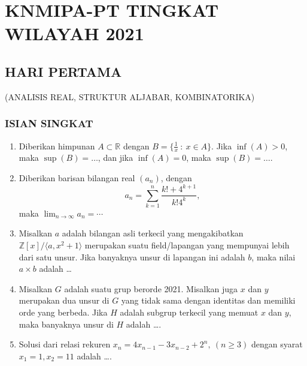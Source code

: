 \documentclass[12pt,twoside]{article}
\begin{document}
\section{KNMIPA-PT TINGKAT WILAYAH 2021}
\subsection{HARI PERTAMA}
\begin{center}
	(ANALISIS REAL, STRUKTUR ALJABAR, KOMBINATORIKA)
\end{center}
\subsubsection*{ISIAN SINGKAT}
\begin{enumerate}
	\item Diberikan himpunan $A\subset \mathbb{R}$ dengan $B=\{\frac{1}{x}~:~x\in A\}$. Jika $\inf(A)>0$, maka $\sup(B)=\dots$, dan jika $\inf(A)=0$, maka $\sup(B)=\dots$.
	\item Diberikan barisan bilangan real $(a_n)$, dengan
	      \[a_n =\sum_{k=1}^n \frac{k!+4^{k+1}}{k!4^k},\]
	      maka $\displaystyle\lim_{n\rightarrow\infty}a_n=\cdots$
	\item Misalkan $a$ adalah bilangan asli terkecil yang mengakibatkan $\mathbb{Z}[x]/\langle a,x^2+1\rangle$ merupakan suatu field/lapangan yang mempunyai lebih dari satu unsur. Jika banyaknya unsur di lapangan ini adalah $b$, maka nilai $a\times b$ adalah \dots
	\item Misalkan $G$ adalah suatu grup berorde 2021. Misalkan juga $x$ dan $y$ merupakan dua unsur di $G$ yang tidak sama dengan identitas dan memiliki orde yang berbeda. Jika $H$ adalah subgrup terkecil yang memuat $x$ dan $y$, maka banyaknya unsur di $H$ adalah \dots.
	\item Solusi dari relasi rekuren $x_n=4x_{n-1}-3x_{n-2}+2^n, ~(n\geq 3)$ dengan syarat $x_1=1, x_2=11$ adalah \dots.
\end{enumerate}
\end{document}
